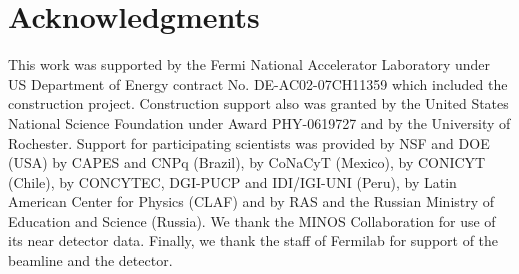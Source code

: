 \section*{Acknowledgments}
This work was supported by the Fermi National Accelerator Laboratory
under US Department of Energy contract
No. DE-AC02-07CH11359 which included the \minerva construction project.
Construction support also
was granted by the United States National Science Foundation under
Award PHY-0619727 and by the University of Rochester. Support for
participating scientists was provided by NSF and DOE (USA) by CAPES
and CNPq (Brazil), by CoNaCyT (Mexico), by CONICYT (Chile), by
CONCYTEC, DGI-PUCP and IDI/IGI-UNI (Peru), by Latin American Center for
Physics (CLAF) and by RAS and the Russian Ministry of Education and Science (Russia).  We
thank the MINOS Collaboration for use of its
near detector data. Finally, we thank the staff of
Fermilab for support of the beamline and the detector.


